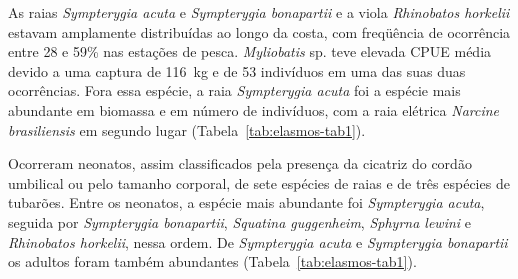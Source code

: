 \documentclass[a4paper,11pt,twoside,showtrims,onecolumn,openright,final]{memoir}
\begin{document}
As raias \emph{Sympterygia acuta} e \emph{Sympterygia bonapartii} e a viola \emph{Rhinobatos horkelii} 
estavam amplamente distribuídas ao longo da costa, com freqüência de ocorrência entre 28 e 59\% nas 
estações de pesca. \emph{Myliobatis} sp. teve elevada CPUE média devido a uma captura de 116~kg e 
de 53 indivíduos em uma das suas duas ocorrências. Fora essa espécie, a raia \emph{Sympterygia acuta} foi a 
espécie mais abundante em biomassa e em número de indivíduos, com a raia elétrica \emph{Narcine brasiliensis} 
em segundo lugar (Tabela~\ref{tab:elasmos-tab1}).

Ocorreram neonatos, assim classificados pela presença da cicatriz do cordão umbilical ou pelo tamanho corporal, 
de sete espécies de raias e de três espécies de tubarões. Entre os neonatos, 
a espécie mais abundante foi \emph{Sympterygia acuta}, seguida por \emph{Sympterygia bonapartii}, 
\emph{Squatina guggenheim}, \emph{Sphyrna lewini} e \emph{Rhinobatos horkelii}, nessa ordem. 
De \emph{Sympterygia acuta} e \emph{Sympterygia bonapartii} os adultos foram também abundantes (Tabela~\ref{tab:elasmos-tab1}).

%
\end{document}
